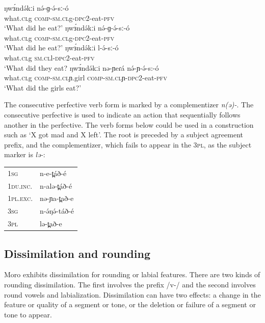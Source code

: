 \ea
\begin{xlist}
	\ex \gll ŋwɜ́ndə́kːi 	nə́-ɡ-ə́-sː-ó	\\
		what.\textsc{cl}g	\textsc{comp}-\textsc{sm.cl}g-\textsc{dpc}2-eat-\textsc{pfv} \\ 
		\trans ‘What did he eat?’
	\ex \gll ŋwɜ́ndə́kːi 	nə́-ɡ-ə́-sː-ó	\\
		what.\textsc{cl}g	\textsc{comp}-\textsc{sm.cl}g-\textsc{dpc}2-eat-\textsc{pfv}  \\
		\trans ‘What did he eat?’
	\ex	\gll ŋwɜ́ndə́kːi 	l-ə́-sː-ó\\
		what.\textsc{cl}g	\textsc{sm.cl}l-\textsc{dpc}2-eat-\textsc{pfv}  \\
		\trans ‘What did they eat?
	\ex \gll ŋwɜ́ndə́kːi 	nə-ɲeɾá 	nə́-ɲ-ə́-s:-ó\\
		what.\textsc{cl}g	\textsc{comp}-\textsc{sm.cl}ɲ.girl	\textsc{comp}-\textsc{sm.cl}ɲ-\textsc{dpc}2-eat-\textsc{pfv}  \\
		\trans ‘What did the girls eat?’
\end{xlist}
\z

The consecutive perfective verb form is marked by a complementizer \textit{n(ə)-}. The consecutive perfective is used to indicate an action that sequentially follows another in the perfective. The verb forms below could be used in a construction such as ‘X got mad and X left’. The root is preceded by a subject agreement prefix, and the complementizer, which fails to appear in the 3\textsc{pl}, as the subject marker is \textit{lə-}:

\ea
\begin{tabular}[t]{ll}
1\textsc{sg}		&	n-e-t̪áð-é	\\	 
1\textsc{du.inc.}&	n-alə-t̪áð-é\\
1\textsc{pl.exc.}&	nə-ɲa-t̪að-e \\
3\textsc{sg}		&	n-ə́ŋə́-táð-é \\
3\textsc{pl}		&	lə-t̪að-e\\
\end{tabular}
\z

\subsection{Dissimilation and rounding}\label{sec:ch5:dissimilation}
Moro exhibits dissimilation for rounding or labial features. There are two kinds of rounding dissimilation. The first involves the prefix /v-/ and the second involves round vowels and labialization. Dissimilation can have two effects: a change in the feature or quality of a segment or tone, or the deletion or failure of a segment or tone to appear. 

